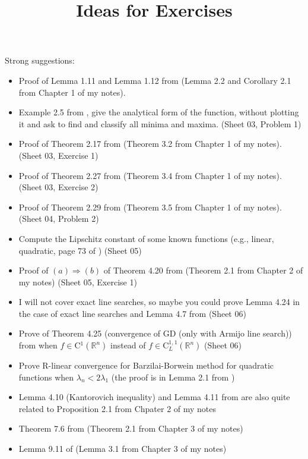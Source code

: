 \documentclass[10pt,a4paper]{article}
\title{Ideas for Exercises}
\date{}
\begin{document}
\maketitle
\noindent Strong suggestions:
\begin{itemize}
    \item Proof of Lemma 1.11 and Lemma 1.12 from \cite{beck14a} (Lemma 2.2 and Corollary 2.1 from Chapter 1 of my notes). \checkmark  
    \item Example 2.5 from \cite{beck14a}, give the analytical form of the function, without plotting it and ask to find and classify all minima and maxima. \checkmark (Sheet 03, Problem 1)
    \item Proof of Theorem 2.17 from \cite{beck14a} (Theorem 3.2  from Chapter 1 of  my notes). \checkmark (Sheet 03, Exercise 1)
    \item Proof of Theorem 2.27 from \cite{beck14a} (Theorem 3.4  from Chapter 1 of  my notes). \checkmark (Sheet 03, Exercise 2)
    \item Proof of Theorem 2.29 from \cite{beck14a} (Theorem 3.5  from Chapter 1 of  my notes). \checkmark (Sheet 04, Problem 2)
    \item Compute the Lipschitz constant of some known functions (e.g., linear, quadratic, page 73 of \cite{beck14a})  \checkmark (Sheet 05)
    \item Proof of $(a)\Rightarrow(b)$ of Theorem 4.20 from \cite{beck14a} (Theorem 2.1  from Chapter 2 of my notes) \checkmark (Sheet 05, Exercise 1)
    \item I will not cover exact line searches, so maybe you could prove Lemma 4.24 in the case of exact line searches and Lemma 4.7 from \cite{beck14a}  \checkmark (Sheet 06)
    \item Prove of Theorem 4.25 (convergence of GD (only with Armijo line search)) from \cite{beck14a} when $f\in $C$^1(\mathbb{R}^n)$ instead of $f\in $C$^{1,1}_L(\mathbb{R}^n)$
    \checkmark (Sheet 06)
    \item Prove R-linear convergence for Barzilai-Borwein method for quadratic functions when $\lambda_n<2\lambda_1$ (the proof is in Lemma 2.1 from \cite{dai02a})
    \item Lemma 4.10 (Kantorovich inequality) and Lemma 4.11 from \cite{beck14a} are also quite related to Proposition 2.1 from Chpater 2 of my notes 
    \item Theorem 7.6 from \cite{beck14a} (Theorem 2.1 from Chapter 3 of my notes)
    \item Lemma 9.11 of \cite{beck14a} (Lemma 3.1 from Chapter 3 of my notes)
\end{itemize}
\end{document}

